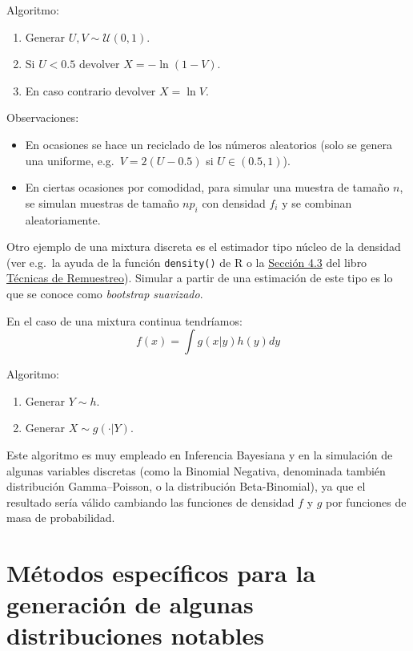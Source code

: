 \documentclass[
]{book}
\theoremstyle{break}
\theoremstyle{definition}
\theoremstyle{definition}
\theoremstyle{definition}
\theoremstyle{remark}
\begin{document}
Algoritmo:

\begin{enumerate}
\def\labelenumi{\arabic{enumi}.}
\item
  Generar \(U,V\sim \mathcal{U}\left( 0,1\right)\).
\item
  Si \(U<0.5\) devolver \(X=-\ln \left( 1-V\right)\).
\item
  En caso contrario devolver \(X=\ln V\).
\end{enumerate}

Observaciones:

\begin{itemize}
\item
  En ocasiones se hace un reciclado de los números aleatorios
  (solo se genera una uniforme, e.g.~\(V=2(U-0.5)\) si
  \(U\in (0.5,1)\)).
\item
  En ciertas ocasiones por comodidad, para simular una muestra de
  tamaño \(n\), se simulan muestras de tamaño \(np_{i}\) con densidad
  \(f_{i}\) y se combinan aleatoriamente.
\end{itemize}

Otro ejemplo de una mixtura discreta es el estimador tipo núcleo de la densidad (ver e.g.~la ayuda de la función \texttt{density()} de R o la \href{https://rubenfcasal.github.io/book_remuestreo/cap4-boot-suav.html}{Sección 4.3} del libro \href{https://rubenfcasal.github.io/book_remuestreo}{Técnicas de Remuestreo}).
Simular a partir de una estimación de este tipo es lo que se conoce como \emph{bootstrap suavizado}.

En el caso de una mixtura continua tendríamos:
\[f(x)=\int g(x|y)h(y)dy\]

Algoritmo:

\begin{enumerate}
\def\labelenumi{\arabic{enumi}.}
\item
  Generar \(Y\sim h\).
\item
  Generar \(X\sim g(\cdot |Y)\).
\end{enumerate}

Este algoritmo es muy empleado en Inferencia Bayesiana y en la simulación de algunas variables discretas (como la Binomial Negativa, denominada también distribución Gamma--Poisson, o la distribución Beta-Binomial),
ya que el resultado sería válido cambiando las funciones de densidad \(f\) y \(g\) por funciones de masa de probabilidad.

\hypertarget{muxe9todos-especuxedficos-para-la-generaciuxf3n-de-algunas-distribuciones-notables}{%
\section{Métodos específicos para la generación de algunas distribuciones notables}\label{muxe9todos-especuxedficos-para-la-generaciuxf3n-de-algunas-distribuciones-notables}}
\end{document}
